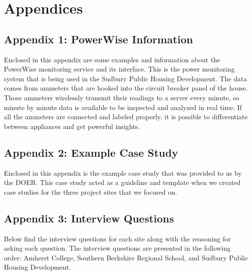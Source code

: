 \newpage
\chapter*{Appendices}

\section*{Appendix 1: PowerWise Information}
\par Enclosed in this appendix are some examples and information about the PowerWise monitoring service and its interface. This is the power monitoring system that is being used in the Sudbury Public Housing Development. The data comes from ammeters that are hooked into the circuit breaker panel of the house. Those ammeters wirelessly transmit their readings to a server every minute, so minute by minute data is available to be inspected and analyzed in real time. If all the ammeters are connected and labeled properly, it is possible to differentiate between appliances and get powerful insights.


\newpage
\section*{Appendix 2: Example Case Study}
\par Enclosed in this appendix is the example case study that was provided to us by the DOER. This case study acted as a guideline and template when we created case studies for the three project sites that we focused on.


\newpage
\section*{Appendix 3: Interview Questions}
\par Below find the interview questions for each site along with the reasoning for asking each question. The interview questions are presented in the following order: Amherst College, Southern Berkshire Regional School, and Sudbury Public Housing Development.


\newpage
